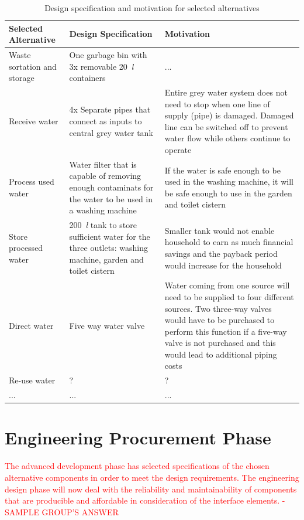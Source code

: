 \documentclass[a4paper,11pt,fleqn]{report}
\begin{document}
\begin{table}[h!]
\caption {Design specification and motivation for selected alternatives} \label{tb: Functional_design_specs} 
\begin{center}
\begin{tabular}{p{4.5cm}|p{4.5cm}|p{4.5cm}}\toprule
	{\textbf{Selected Alternative}} & {\textbf{Design Specification}} & {\textbf{Motivation}}\\ \midrule
    \hline
    Waste sortation and storage & One garbage bin with 3x removable 20~\textit{l} containers& ...\\
        \hline
    Receive water & 4x Separate pipes that connect as inputs to central grey water tank & Entire grey water system does not need to stop when one line of supply (pipe) is damaged. Damaged line can be switched off to prevent water flow while others continue to operate\\
        \hline
    Process used water & Water filter that is capable of removing enough contaminats for the water to be used in a washing machine & If the water is safe enough to be used in the washing machine, it will be safe enough to use in the garden and toilet cistern\\
        \hline
    Store processed water & 200~\textit{l} tank to store sufficient water for the three outlets: washing machine, garden and toilet cistern & Smaller tank would not enable household to earn as much financial savings and the payback period would increase for the household\\
        \hline
    Direct water & Five way water valve & Water coming from one source will need to be supplied to four different sources. Two three-way valves would have to be purchased to perform this function if a five-way valve is not purchased and this would lead to additional piping costs\\
            \hline
    Re-use water & ? & ?\\
            \hline
    ... & ... & ...\\

    \bottomrule
\end{tabular}
\end{center}
\end{table}
%
\section{Engineering Procurement Phase}
\textcolor{red}{The advanced development phase has selected specifications of the chosen alternative components in order to meet the design requirements. The engineering design phase will now deal with the reliability and maintainability of components that are producible and affordable in consideration of the interface elements. - SAMPLE GROUP'S ANSWER}
\end{document}
